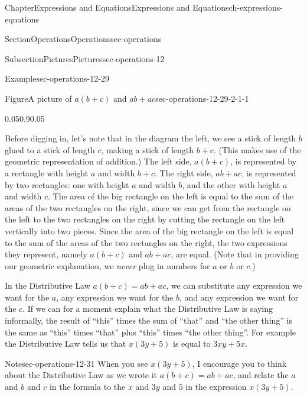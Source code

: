 \documentclass[twoside,11pt,]{book}
\numberwithin{equation}{chapter}
\begin{document}
\begin{chapterptx}{Chapter}{Expressions and Equations}{}{Expressions and Equations}{}{}{ch-expressions-equations}
\begin{sectionptx}{Section}{Operations}{}{Operations}{}{}{sec-operations}
\begin{subsectionptx}{Subsection}{Pictures}{}{Pictures}{}{}{sec-operations-12}
\begin{example}{Example}{}{sec-operations-12-29}
\begin{figureptx}{Figure}{A picture of \(a(b+c)\) and \(ab+ac\)}{sec-operations-12-29-2-1-1}{}
\begin{image}{0.05}{0.9}{0.05}{}
{%
}%
\end{image}%
\tcblower
\end{figureptx}%
 Before digging in, let's note that in the diagram the left, we see a stick of length \(b\) glued to a stick of length \(c\), making a stick of length \(b+c\). (This makes use of the geometric representation of addition.) The left side, \(a(b+c)\), is represented by a rectangle with height \(a\) and width \(b+c\). The right side, \(ab+ac\), is represented by two rectangles: one with height \(a\) and width \(b\), and the other with height \(a\) and width \(c\). The area of the big rectangle on the left is equal to the sum of the areas of the two rectangles on the right, since we can get from the rectangle on the left to the two rectangles on the right by cutting the rectangle on the left vertically into two pieces. Since the area of the big rectangle on the left is equal to the sum of the areas of the two rectangles on the right, the two expressions they represent, namely \(a(b+c)\) and \(ab+ac\), are equal. (Note that in providing our geometric explanation, we \emph{never} plug in numbers for \(a\) or \(b\) or \(c\).)%
\end{example}
In the Distributive Law \(a(b+c)=ab+ac\), we can substitute any expression we want for the \(a\), any expression we want for the \(b\), and any expression we want for the \(c\). If we can for a moment explain what the Distributive Law is saying informally, the result of ``this'' times the sum of ``that'' and ``the other thing'' is the same as ``this'' times ``that'' plus ``this'' times ``the other thing''. For example the Distributive Law tells us that \(x(3y + 5)\) is equal to \(3xy + 5x\).%
\begin{note}{Note}{}{sec-operations-12-31}%
When you see \(x(3y + 5)\), I encourage you to think about the Distributive Law as we wrote it \(a(b+c)=ab+ac\), and relate the \(a\) and \(b\) and \(c\) in the formula to the \(x\) and \(3y\) and \(5\) in the expression \(x(3y + 5)\).%
\par

\end{note}
\end{subsectionptx}
\end{sectionptx}
\end{chapterptx}
\end{document}
